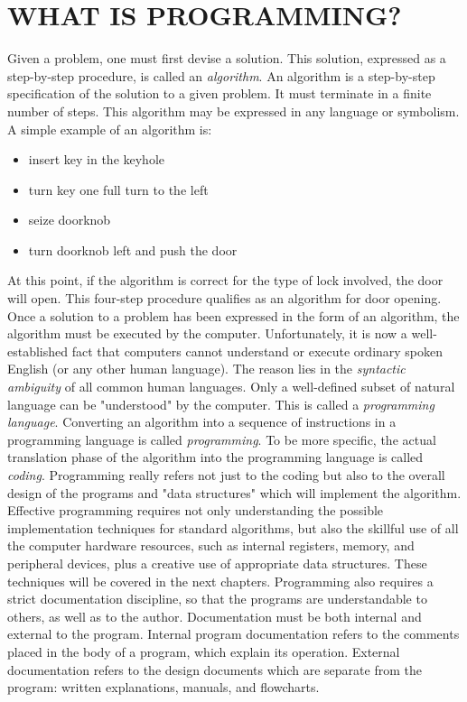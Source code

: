 \documentclass{book}
\begin{document}
\section*{WHAT IS PROGRAMMING?}

Given a problem, one must first devise a solution. This solution,
expressed as a step-by-step procedure, is called an \textit{algorithm}. An
algorithm is a step-by-step specification of the solution to a given
problem. It must terminate in a finite number of steps. This
algorithm may be expressed in any language or symbolism. A simple example of an algorithm is:

\begin{itemize}
\item{insert key in the keyhole}
\item{turn key one full turn to the left}
\item{seize doorknob}
\item{turn doorknob left and push the door}
\end{itemize}

At this point, if the algorithm is correct for the type of lock involved, the door will open. This four-step procedure qualifies as an algorithm for door opening.
Once a solution to a problem has been expressed in the form of an algorithm, the algorithm must be executed by the computer.
Unfortunately, it is now a well-established fact that computers cannot understand or execute ordinary spoken English (or any other human language). The reason lies in the \textit{syntactic ambiguity} of all common human languages. Only a well-defined subset of natural language can be "understood" by the computer. This is called a \textit{programming language}.
Converting an algorithm into a sequence of instructions in a programming language is called \textit{programming}. To be more specific, the actual translation phase of the algorithm into the programming language is called \textit{coding}. Programming really refers not just to the coding but also to the overall design of the programs and "data structures" which will implement the algorithm.
Effective programming requires not only understanding the possible implementation techniques for standard algorithms, but also the skillful use of all the computer hardware resources, such as internal registers, memory, and peripheral devices, plus a creative use of appropriate data structures. These techniques will be covered in the next chapters.
Programming also requires a strict documentation discipline, so that the programs are understandable to others, as well as to the author. Documentation must be both internal and external to the program.
Internal program documentation refers to the comments placed in the body of a program, which explain its operation.
External documentation refers to the design documents which are separate from the program: written explanations, manuals, and flowcharts.
\end{document}
